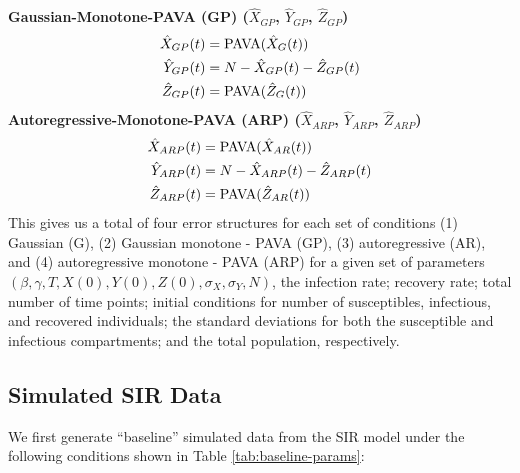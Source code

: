 \documentclass[12pt]{article}
\begin{document}
\noindent \textbf{Gaussian-Monotone-PAVA (GP) ($\hat{X}_{GP}$, $\hat{Y}_{GP}$, $\hat{Z}_{GP}$)}
\begin{align*}
 \hat{X}_{GP}(t) &= \textnormal{PAVA}(\hat{X}_G(t)) \\
  \hat{Y}_{GP}(t) &= N - \hat{X}_{GP}(t) - \hat{Z}_{GP}(t) \\
  \hat{Z}_{GP}(t) &= \textnormal{PAVA}(\hat{Z}_G(t)) \\
\end{align*}
\textbf{Autoregressive-Monotone-PAVA (ARP) ($\hat{X}_{ARP}$, $\hat{Y}_{ARP}$, $\hat{Z}_{ARP}$)}
\begin{align*}
  \hat{X}_{ARP}(t) &= \textnormal{PAVA}(\hat{X}_{AR}(t)) \\
  \hat{Y}_{ARP}(t) &= N - \hat{X}_{ARP}(t) - \hat{Z}_{ARP}(t) \\
  \hat{Z}_{ARP}(t) &= \textnormal{PAVA}(\hat{Z}_{AR}(t)) 
\end{align*}
This gives us a total of four error structures for each set of conditions  (1) Gaussian (G), (2) Gaussian monotone - PAVA (GP),  (3) autoregressive (AR), and (4) autoregressive monotone - PAVA (ARP) for a given set of parameters $\left (\beta, \gamma, T, X(0), Y(0), Z(0), \sigma_X, \sigma_Y, N \right )$, the infection rate; recovery rate; total number of time points; initial conditions for number of susceptibles, infectious, and recovered individuals; the standard deviations for both the susceptible and infectious compartments; and the total population, respectively.


\subsection{Simulated SIR Data}

We first generate ``baseline'' simulated data from the SIR model under the following conditions shown in Table \ref{tab:baseline-params}: 
\end{document}
